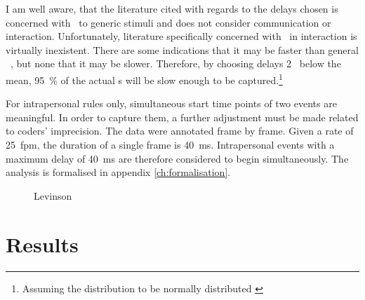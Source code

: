 I am well aware, that the literature cited with regards to the delays chosen is concerned with \rt\ to generic stimuli and does not consider communication or interaction. Unfortunately, literature specifically concerned with \rt\ in interaction is virtually inexistent. There are some indications that it may be faster than general \rt\ \citep{levinson16}, but none that it may be slower. Therefore, by choosing delays 2 \sd\ below the mean, 95~\% of the actual \rt s will be slow enough to be captured.\footnote{Assuming the distribution to be normally distributed \citep[]{moore16}} 

For intrapersonal rules only, simultaneous start time points of two events are meaningful. In order to capture them, a further adjustment must be made related to coders' imprecision. The data were annotated frame by frame. Given a rate of 25~fpm, the duration of a single frame is 40~ms. Intrapersonal events with a maximum delay of 40~ms are therefore considered to begin simultaneously. The analysis is formalised in appendix \ref{ch:formalisation}.

\begin{figure}
	\centering
	
	\caption{Levinson}
	\label{fig:levinson}
\end{figure}

\section{Results}
\label{sec:miningresults}



































